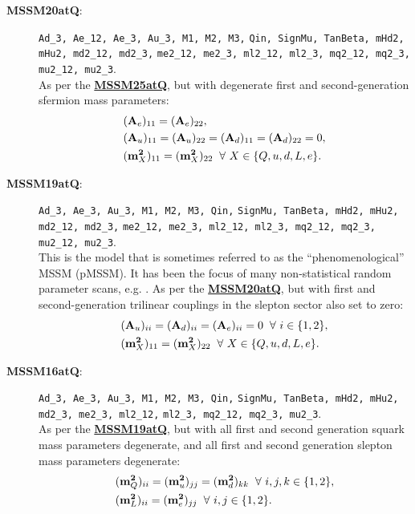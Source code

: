 \documentclass[pdftex,twocolumn,epjc3_preprint,runningheads]{svjour3}
\renewcommand{\_}{\discretionary{\underscore}{}{\underscore}}
\newcommand\term[1]{{\lstset{style=terminal}\lstinline!#1!\lstset{style=cpp}}}
\newcommand{\doublecrosssf}[2]{\hyperref[#2]{\textbf{\textsf{#1}}}}
\newcommand{\gsfitemc}[1]{\item[\textbf{\textsf{#1}}\label{#1}:]}
\begin{document}
\begin{description}
\gsfitemc{MSSM20atQ} \mbox{\term{Ad_3, Ae_12, Ae_3, Au_3, M1, M2, M3,}}
                     \term{Qin, SignMu, TanBeta, mHd2, mHu2, md2_12, md2_3,}
                     \term{me2_12, me2_3, ml2_12, ml2_3, mq2_12, mq2_3,}
                     \term{mu2_12, mu2_3}.\\
As per the \doublecrosssf{MSSM25atQ}{MSSM25atQ}, but with degenerate first and second-generation sfermion mass parameters:
\begin{align}
&(\mathbf{A}_e)_{11} = (\mathbf{A}_e)_{22},\\
&(\mathbf{A}_u)_{11} = (\mathbf{A}_u)_{22} = (\mathbf{A}_d)_{11} = (\mathbf{A}_d)_{22} = 0, \\
&(\mathbf{m}^\mathbf{2}_X)_{11} = (\mathbf{m}^\mathbf{2}_X)_{22}\hspace{2mm} \forall\ X\in\{Q,u,d,L,e\}.
\end{align}

\gsfitemc{MSSM19atQ} \term{Ad_3, Ae_3, Au_3, M1, M2, M3, Qin,}
                     \term{SignMu, TanBeta, mHd2, mHu2, md2_12, md2_3,}
                     \term{me2_12, me2_3, ml2_12, ml2_3, mq2_12, mq2_3,}
                     \term{mu2_12, mu2_3}.\\
This is the model that is sometimes referred to as the ``phenomenological'' MSSM (pMSSM).  It has been the focus of many non-statistical random parameter scans, e.g. \cite{Berger09,LATpMSSM,Conley11,Arbey12,ATLAS15}. As per the \doublecrosssf{MSSM20atQ}{MSSM20atQ}, but with first and second-generation trilinear couplings in the slepton sector also set to zero:
\begin{align}
&(\mathbf{A}_u)_{ii} = (\mathbf{A}_d)_{ii} = (\mathbf{A}_e)_{ii} = 0 \hspace{2mm} \forall\ i\in\{1,2\},\\
&(\mathbf{m}^\mathbf{2}_X)_{11} = (\mathbf{m}^\mathbf{2}_X)_{22}\hspace{2mm} \forall\ X\in\{Q,u,d,L,e\}.
\end{align}

\gsfitemc{MSSM16atQ} \term{Ad_3, Ae_3, Au_3, M1, M2, M3, Qin,}
                     \term{SignMu, TanBeta, mHd2, mHu2, md2_3, me2_3, ml2_12,}
                     \term{ml2_3, mq2_12, mq2_3, mu2_3}.\\
As per the \doublecrosssf{MSSM19atQ}{MSSM19atQ}, but with all first and second generation squark mass parameters degenerate, and all first and second generation slepton mass parameters degenerate:
\begin{align}
&(\mathbf{m}^\mathbf{2}_Q)_{ii} = (\mathbf{m}^\mathbf{2}_u)_{jj} = (\mathbf{m}^\mathbf{2}_d)_{kk} \hspace{2mm} \forall\ i,j,k\in\{1,2\},\\
&(\mathbf{m}^\mathbf{2}_L)_{ii} = (\mathbf{m}^\mathbf{2}_e)_{jj} \hspace{2mm} \forall\ i,j\in\{1,2\}.
\end{align}


\end{description}
\end{document}
